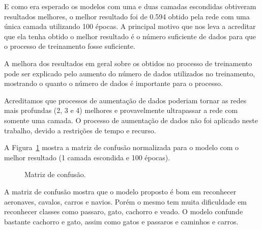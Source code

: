 \documentclass[conference]{IEEEtran}
\begin{document}
E como era esperado os modelos com uma e duas camadas escondidas obtiveram resultados melhores, o melhor resultado foi de 0.594 obtido pela rede com uma única camada utilizando 100 épocas. A principal motivo que nos leva a acreditar que ela tenha obtido o melhor resultado é o número suficiente de dados para que o processo de treinamento fosse suficiente. 

A melhora dos resultados em geral sobre os obtidos no processo de treinamento pode ser explicado pelo aumento do número de dados utilizados no treinamento, mostrando o quanto o número de dados é importante para o processo. 

Acreditamos que processos de aumentação de dados poderiam tornar as redes mais profundas (2, 3 e 4) melhores e provavelmente ultrapassar a rede com somente uma camada. O processo de aumentação de dados não foi aplicado neste trabalho, devido a restrições de tempo e recurso.

A Figura~\ref{fig:confusion} mostra a matriz de confusão normalizada para o modelo com o melhor resultado (1 camada escondida e 100 épocas).

\begin{figure}[!h]
	\centering
	{
		\setlength{\fboxsep}{1pt}
		\setlength{\fboxrule}{1pt}
	}
	\caption{Matriz de confusão.}
	\label{fig:confusion}
\end{figure}

A matriz de confusão mostra que o modelo proposto é bom em reconhecer aeronaves, cavalos, carros e navios. Porém o mesmo tem muita dificuldade em reconhecer classes como passaro, gato, cachorro e veado. O modelo confunde bastante cachorro e gato, assim como gatos e passaros e caminhos e carros.
\end{document}
